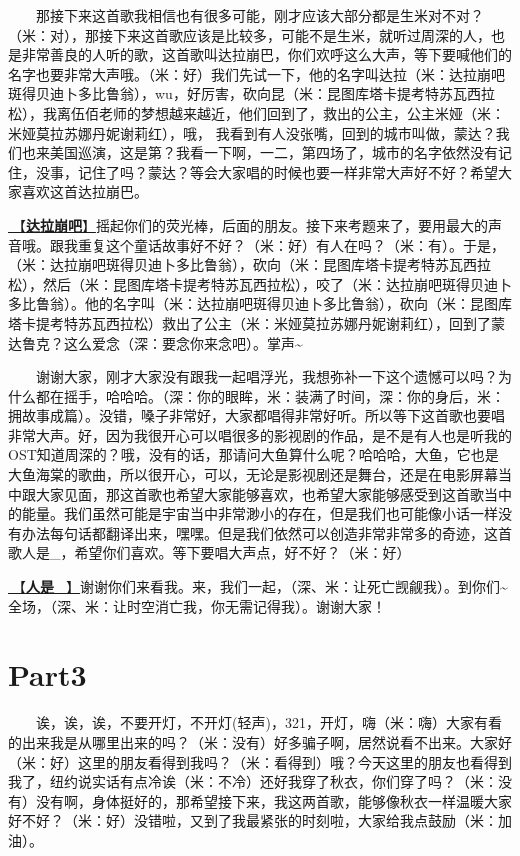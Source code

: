 \documentclass[]{ctexbook}
\begin{document}
  那接下来这首歌我相信也有很多可能，刚才应该大部分都是生米对不对？（米：对），那接下来这首歌应该是比较多，可能不是生米，就听过周深的人，也是非常善良的人听的歌，这首歌叫达拉崩巴，你们欢呼这么大声，等下要喊他们的名字也要非常大声哦。（米：好）我们先试一下，他的名字叫达拉（米：达拉崩吧斑得贝迪卜多比鲁翁），wu，好厉害，砍向昆（米：昆图库塔卡提考特苏瓦西拉松），我离伍佰老师的梦想越来越近，他们回到了，救出的公主，公主米娅（米：米娅莫拉苏娜丹妮谢莉红），哦， 我看到有人没张嘴，回到的城市叫做，蒙达？我们也来美国巡演，这是第？我看一下啊，一二，第四场了，城市的名字依然没有记住，没事，记住了吗？蒙达？等会大家唱的时候也要一样非常大声好不好？希望大家喜欢这首达拉崩巴。

\hyperref[dalabengba]{🎵【\textbf{达拉崩吧}】}摇起你们的荧光棒，后面的朋友。接下来考题来了，要用最大的声音哦。跟我重复这个童话故事好不好？（米：好）有人在吗？（米：有）。于是，（米：达拉崩吧斑得贝迪卜多比鲁翁），砍向（米：昆图库塔卡提考特苏瓦西拉松），然后（米：昆图库塔卡提考特苏瓦西拉松），咬了（米：达拉崩吧斑得贝迪卜多比鲁翁）。他的名字叫（米：达拉崩吧斑得贝迪卜多比鲁翁），砍向（米：昆图库塔卡提考特苏瓦西拉松）救出了公主（米：米娅莫拉苏娜丹妮谢莉红），回到了蒙达鲁克？这么爱念（深：要念你来念吧）。掌声\textasciitilde{}

  谢谢大家，刚才大家没有跟我一起唱浮光，我想弥补一下这个遗憾可以吗？为什么都在摇手，哈哈哈。（深：你的眼眸，米：装满了时间，深：你的身后，米：拥故事成篇）。没错，嗓子非常好，大家都唱得非常好听。所以等下这首歌也要唱非常大声。好，因为我很开心可以唱很多的影视剧的作品，是不是有人也是听我的OST知道周深的？哦，没有的话，那请问大鱼算什么呢？哈哈哈，大鱼，它也是大鱼海棠的歌曲，所以很开心，可以，无论是影视剧还是舞台，还是在电影屏幕当中跟大家见面，那这首歌也希望大家能够喜欢，也希望大家能够感受到这首歌当中的能量。我们虽然可能是宇宙当中非常渺小的存在，但是我们也可能像小话一样没有办法每句话都翻译出来，嘿嘿。但是我们依然可以创造非常非常多的奇迹，这首歌人是\_，希望你们喜欢。等下要唱大声点，好不好？（米：好）

\hyperref[renshi]{🎵【\textbf{人是\_}】}谢谢你们来看我。来，我们一起，（深、米：让死亡觊觎我）。到你们\textasciitilde 全场，（深、米：让时空消亡我，你无需记得我）。谢谢大家！

\section{Part3}\label{NewYork-20250309-part3}

  诶，诶，诶，不要开灯，不开灯(轻声)，321，开灯，嗨（米：嗨）大家有看的出来我是从哪里出来的吗？（米：没有）好多骗子啊，居然说看不出来。大家好（米：好）这里的朋友看得到我吗？（米：看得到）哦？今天这里的朋友也看得到我了，纽约说实话有点冷诶（米：不冷）还好我穿了秋衣，你们穿了吗？（米：没有）没有啊，身体挺好的，那希望接下来，我这两首歌，能够像秋衣一样温暖大家好不好？（米：好）没错啦，又到了我最紧张的时刻啦，大家给我点鼓励（米：加油）。
\end{document}
